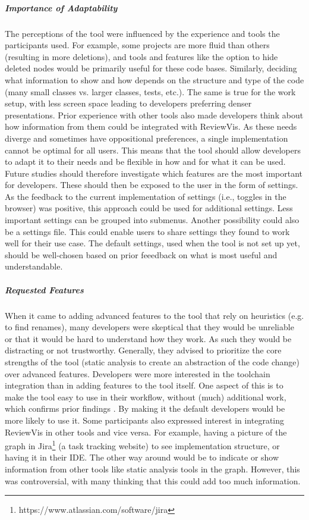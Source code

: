 \documentclass[a4paper,11pt,twoside]{article}
\theoremstyle{definition} %
\begin{document}
\subparagraph{Importance of Adaptability}
The perceptions of the tool were influenced by the experience and tools the participants used. For example, some projects are more fluid than others (resulting in more deletions), and tools and features like the option to hide deleted nodes would be primarily useful for these code bases. Similarly, deciding what information to show and how depends on the structure and type of the code (many small classes vs. larger classes, tests, etc.). The same is true for the work setup, with less screen space leading to developers preferring denser presentations. Prior experience with other tools also made developers think about how information from them could be integrated with ReviewVis. As these needs diverge and sometimes have oppositional preferences, a single implementation cannot be optimal for all users. This means that the tool should allow developers to adapt it to their needs and be flexible in how and for what it can be used.
Future studies should therefore investigate which features are the most important for developers. These should then be exposed to the user in the form of settings. As the feedback to the current implementation of settings (i.e., toggles in the browser) was positive, this approach could be used for additional settings. Less important settings can be grouped into submenus. Another possibility could also be a settings file. This could enable users to share settings they found to work well for their use case. The default settings, used when the tool is not set up yet, should be well-chosen based on prior feeedback on what is most useful and understandable.

\subparagraph{Requested Features}
When it came to adding advanced features to the tool that rely on heuristics (e.g. to find renames), many developers were skeptical that they would be unreliable or that it would be hard to understand how they work. As such they would be distracting or not trustworthy. Generally, they advised to prioritize the core strengths of the tool (static analysis to create an abstraction of the code change) over advanced features. Developers were more interested in the toolchain integration than in adding features to the tool itself. One aspect of this is to make the tool easy to use in their workflow, without (much) additional work, which confirms prior findings \citep{6606613, 10.1145/3188720}. By making it the default developers would be more likely to use it. Some participants also expressed interest in integrating ReviewVis in other tools and vice versa. For example, having a picture of the graph in Jira\footnote{https://www.atlassian.com/software/jira} (a task tracking website) to see implementation structure, or having it in their IDE. The other way around would be to indicate or show information from other tools like static analysis tools in the graph. However, this was controversial, with many thinking that this could add too much information.
   
\end{document}
